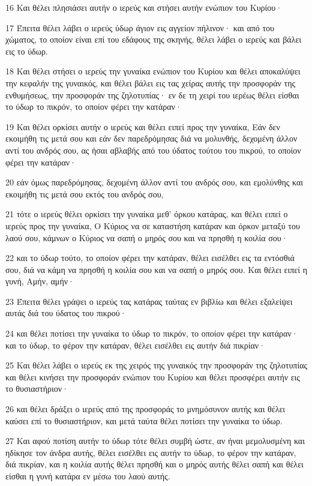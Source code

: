\par 16 Και θέλει πλησιάσει αυτήν ο ιερεύς και στήσει αυτήν ενώπιον του Κυρίου·
\par 17 Έπειτα θέλει λάβει ο ιερεύς ύδωρ άγιον εις αγγείον πήλινον· και από του χώματος, το οποίον είναι επί του εδάφους της σκηνής, θέλει λάβει ο ιερεύς και βάλει εις το ύδωρ.
\par 18 Και θέλει στήσει ο ιερεύς την γυναίκα ενώπιον του Κυρίου και θέλει αποκαλύψει την κεφαλήν της γυναικός, και θέλει βάλει εις τας χείρας αυτής την προσφοράν της ενθυμήσεως, την προσφοράν της ζηλοτυπίας· εν δε τη χειρί του ιερέως θέλει είσθαι το ύδωρ το πικρόν, το οποίον φέρει την κατάραν·
\par 19 Και θέλει ορκίσει αυτήν ο ιερεύς και θέλει ειπεί προς την γυναίκα, Εάν δεν εκοιμήθη τις μετά σου και εάν δεν παρεδρόμησας διά να μολυνθής, δεχομένη άλλον αντί του ανδρός σου, ας ήσαι αβλαβής από του ύδατος τούτου του πικρού, το οποίον φέρει την κατάραν·
\par 20 εάν όμως παρεδρόμησας, δεχομένη άλλον αντί του ανδρός σου, και εμολύνθης και εκοιμήθη τις μετά σου εκτός του ανδρός σου,
\par 21 τότε ο ιερεύς θέλει ορκίσει την γυναίκα μεθ' όρκου κατάρας, και θέλει ειπεί ο ιερεύς προς την γυναίκα, Ο Κύριος να σε καταστήση κατάραν και όρκον μεταξύ του λαού σου, κάμνων ο Κύριος να σαπή ο μηρός σου και να πρησθή η κοιλία σου·
\par 22 και το ύδωρ τούτο, το οποίον φέρει την κατάραν, θέλει εισέλθει εις τα εντόσθιά σου, διά να κάμη να πρησθή η κοιλία σου και να σαπή ο μηρός σου. Και θέλει ειπεί η γυνή, Αμήν, αμήν·
\par 23 Έπειτα θέλει γράψει ο ιερεύς τας κατάρας ταύτας εν βιβλίω και θέλει εξαλείψει αυτάς διά του ύδατος του πικρού·
\par 24 και θέλει ποτίσει την γυναίκα το ύδωρ το πικρόν, το οποίον φέρει την κατάραν· και το ύδωρ, το φέρον την κατάραν, θέλει εισέλθει εις αυτήν διά πικρίαν·
\par 25 Και θέλει λάβει ο ιερεύς εκ της χειρός της γυναικός την προσφοράν της ζηλοτυπίας και θέλει κινήσει την προσφοράν ενώπιον του Κυρίου και θέλει προσφέρει αυτήν εις το θυσιαστήριον·
\par 26 και θέλει δράξει ο ιερεύς από της προσφοράς το μνημόσυνον αυτής και θέλει καύσει επί το θυσιαστήριον, και μετά ταύτα θέλει ποτίσει την γυναίκα το ύδωρ.
\par 27 Και αφού ποτίση αυτήν το ύδωρ τότε θέλει συμβή ώστε, αν ήναι μεμολυσμένη και ηδίκησε τον άνδρα αυτής, θέλει εισέλθει εις αυτήν το ύδωρ, το φέρον την κατάραν, διά πικρίαν, και η κοιλία αυτής θέλει πρησθή και ο μηρός αυτής θέλει σαπή και θέλει είσθαι η γυνή κατάρα εν μέσω του λαού αυτής.
